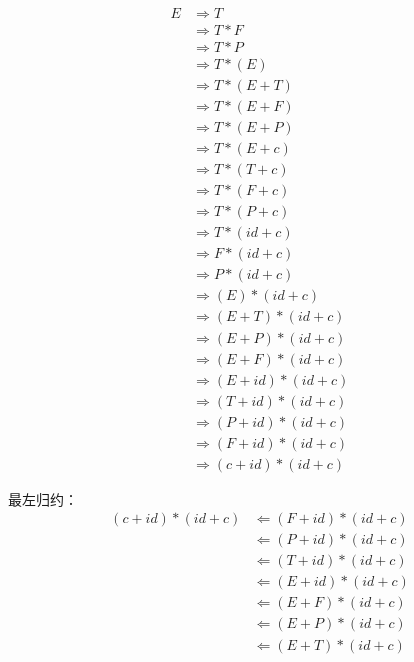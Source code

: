 \documentclass{ctexart}
\newcommand*{\tto}[0]{\Rightarrow}
\newcommand*{\ffrom}[0]{\Leftarrow}
\begin{document}
\begin{outline}
        \begin{align*}
            E &\tto T \\
              &\tto T * F \\
              &\tto T * P \\
              &\tto T * (E)  \\
              &\tto T * (E+T) \\
              &\tto T * (E+F) \\
              &\tto T * (E+P)  \\
              &\tto T * (E+c) \\
              &\tto T * (T+c) \\
              &\tto T * (F+c) \\
              &\tto T * (P+c) \\
              &\tto T * (id + c) \\
              &\tto F * (id + c) \\
              &\tto P * (id + c) \\
              &\tto (E) * (id + c) \\
              &\tto (E+T) * (id + c) \\
              &\tto (E+P) * (id + c) \\
              &\tto (E+F) * (id + c) \\
              &\tto (E+id) * (id + c) \\
              &\tto (T+id) * (id + c) \\
              &\tto (P+id) * (id + c) \\
              &\tto (F+id) * (id + c) \\
              &\tto (c+id) * (id + c)
        \end{align*}
        \begin{minipage}[t]{.45\textwidth}
            \2[] 最左归约： \\
        \begin{align*}
            (c+id) * (id + c) &\ffrom (F+id) * (id + c) \\
              &\ffrom (P+id) * (id + c) \\
              &\ffrom (T+id) * (id + c) \\
              &\ffrom (E+id) * (id + c) \\
              &\ffrom (E+F) * (id + c) \\
              &\ffrom (E+P) * (id + c) \\
              &\ffrom (E+T) * (id + c) \\

\end{align*}
\end{minipage}
\end{outline}
\end{document}

